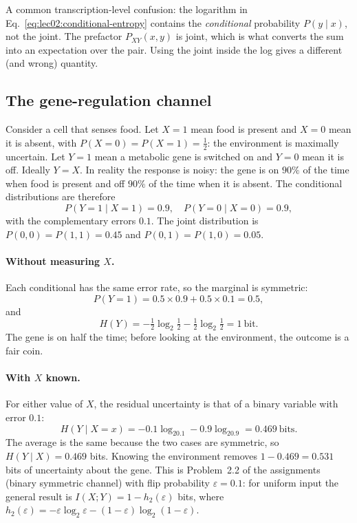 \begin{remark}
A common transcription-level confusion: the logarithm in Eq.~\eqref{eq:lec02:conditional-entropy} contains the \emph{conditional} probability $P(y\mid x)$, not the joint. The prefactor $P_{XY}(x,y)$ is joint, which is what converts the sum into an expectation over the pair. Using the joint inside the log gives a different (and wrong) quantity.
\end{remark}

\subsection{The gene-regulation channel}\label{subsec:lec02:channel}
Consider a cell that senses food. Let $X=1$ mean food is present and $X=0$ mean it is absent, with $P(X=0)=P(X=1)=\tfrac12$: the environment is maximally uncertain. Let $Y=1$ mean a metabolic gene is switched on and $Y=0$ mean it is off. Ideally $Y=X$. In reality the response is noisy: the gene is on $90\%$ of the time when food is present and off $90\%$ of the time when it is absent. The conditional distributions are therefore
\begin{equation}\label{eq:lec02:channel}
P(Y=1\mid X=1)=0.9,\quad P(Y=0\mid X=0)=0.9,
\end{equation}
with the complementary errors $0.1$. The joint distribution is $P(0,0)=P(1,1)=0.45$ and $P(0,1)=P(1,0)=0.05$.

\paragraph{Without measuring $X$.} Each conditional has the same error rate, so the marginal is symmetric:
\begin{equation}\label{eq:lec02:channel-marginal}
P(Y=1)=0.5\times0.9+0.5\times0.1=0.5,
\end{equation}
and
\begin{equation}\label{eq:lec02:channel-HY}
H(Y)=-\tfrac12\log_2\tfrac12-\tfrac12\log_2\tfrac12=1\ \text{bit}.
\end{equation}
The gene is on half the time; before looking at the environment, the outcome is a fair coin.

\paragraph{With $X$ known.} For either value of $X$, the residual uncertainty is that of a binary variable with error $0.1$:
\begin{equation}\label{eq:lec02:channel-h}
H(Y\mid X=x)=-0.1\log_20.1-0.9\log_20.9=0.469\ \text{bits}.
\end{equation}
The average is the same because the two cases are symmetric, so $H(Y\mid X)=0.469$ bits. Knowing the environment removes $1-0.469=0.531$ bits of uncertainty about the gene. This is Problem~2.2 of the assignments (binary symmetric channel) with flip probability $\varepsilon=0.1$: for uniform input the general result is $I(X;Y)=1-h_2(\varepsilon)$ bits, where $h_2(\varepsilon)=-\varepsilon\log_2\varepsilon-(1-\varepsilon)\log_2(1-\varepsilon)$.


